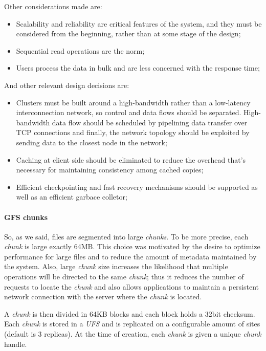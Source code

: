 \noindent
Other considerations made are:
\begin{itemize}
    \item Scalability and reliability are critical features of the system, and
    they must be considered from the beginning, rather than at some stage of the
    design;
    \item Sequential read operations are the norm;
    \item Users process the data in bulk and are less concerned with the
    response time;
\end{itemize}
And other relevant design decisions are:
\begin{itemize}
    \item Clusters must be built around a high-bandwidth rather than a low-latency
    interconnection network, so control and data flows should be separated.
    High-bandwidth data flow should be scheduled by pipelining data transfer over
    TCP connections and finally, the network topology should be exploited by
    sending data to the closest node in the network;
    \item Caching at client side should be eliminated to reduce the overhead
    that's necessary for maintaining consistency among cached copies;
    \item Efficient checkpointing and fast recovery mechanisms should be
    supported as well as an efficient garbace colletor;
\end{itemize}

\paragraph{GFS chunks}
So, as we said, files are segmented into large \emph{chunks}. To be more precise,
each \emph{chunk} is large exactly 64MB. This choice was motivated by the desire
to optimize performance for large files and to reduce the amount of metadata
maintained by the system. Also, large \emph{chunk} size increases the likelihood
that multiple operations will be directed to the same \emph{chunk}; thus it
reduces the number of requests to locate the \emph{chunk} and also allows
applications to maintain a persistent network connection with the server where
the \emph{chunk} is located.

A \emph{chunk} is then divided in 64KB blocks and each block holds a 32bit
checksum. Each \emph{chunk} is stored in a \emph{UFS} and is replicated on a
configurable amount of sites (default is 3 replicas). At the time of creation,
each \emph{chunk} is given a unique \emph{chunk} handle.

